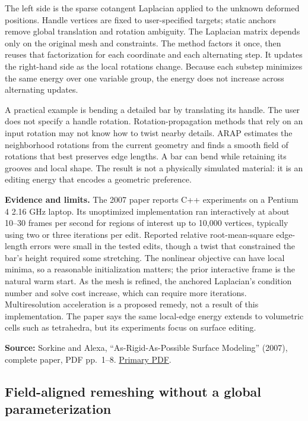The left side is the sparse cotangent Laplacian applied to the unknown deformed positions. Handle vertices are fixed to user-specified targets; static anchors remove global translation and rotation ambiguity. The Laplacian matrix depends only on the original mesh and constraints. The method factors it once, then reuses that factorization for each coordinate and each alternating step. It updates the right-hand side as the local rotations change. Because each substep minimizes the same energy over one variable group, the energy does not increase across alternating updates.

A practical example is bending a detailed bar by translating its handle. The user does not specify a handle rotation. Rotation-propagation methods that rely on an input rotation may not know how to twist nearby details. ARAP estimates the neighborhood rotations from the current geometry and finds a smooth field of rotations that best preserves edge lengths. A bar can bend while retaining its grooves and local shape. The result is not a physically simulated material: it is an editing energy that encodes a geometric preference.

\textbf{Evidence and limits.} The 2007 paper reports C++ experiments on a Pentium 4 2.16 GHz laptop. Its unoptimized implementation ran interactively at about 10--30 frames per second for regions of interest up to 10,000 vertices, typically using two or three iterations per edit. Reported relative root-mean-square edge-length errors were small in the tested edits, though a twist that constrained the bar's height required some stretching. The nonlinear objective can have local minima, so a reasonable initialization matters; the prior interactive frame is the natural warm start. As the mesh is refined, the anchored Laplacian's condition number and solve cost increase, which can require more iterations. Multiresolution acceleration is a proposed remedy, not a result of this implementation. The paper says the same local-edge energy extends to volumetric cells such as tetrahedra, but its experiments focus on surface editing.

\textbf{Source:} Sorkine and Alexa, ``As-Rigid-As-Possible Surface Modeling'' (2007), complete paper, PDF pp.~1--8. \href{https://igl.ethz.ch/projects/ARAP/arap_web.pdf}{Primary PDF}.

\subsection{Field-aligned remeshing without a global parameterization}\label{03-visual-computing-i-ch002-field-aligned-remeshing-without-a-global-parameterization}

